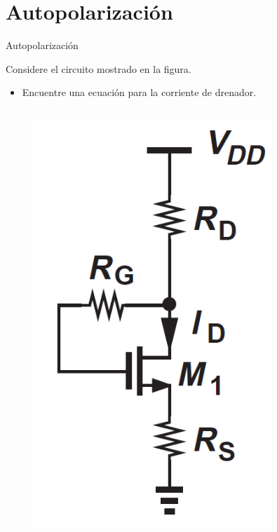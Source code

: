 \documentclass[t,aspectratio=169]{beamer}
\begin{document}
\section{Autopolarización}
\begin{frame}{Autopolarización}

Considere el circuito mostrado en la figura.

\begin{itemize}
    \item Encuentre una ecuación para la corriente de drenador.
\end{itemize}

\begin{columns}

\begin{column}{0.25\textwidth}

\begin{figure}
    \centering
    \includegraphics[width=0.8\textwidth]{figuras/mosfet_autopolarizacion.png}
\end{figure}


\end{column}
\end{columns}
\end{frame}
\end{document}
